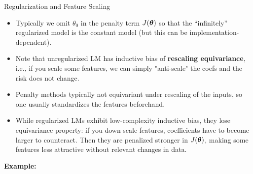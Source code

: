 \documentclass[11pt,compress,t,notes=noshow, xcolor=table]{beamer}
\begin{document}
\begin{vbframe}{Regularization and Feature Scaling}

  \begin{itemize}
    \item Typically we omit $\theta_0$ in the penalty term $J(\bm{\theta})$ so that the ``infinitely'' regularized model is the constant model (but this can be implementation-dependent).
    \item Note that unregularized LM has inductive bias of \textbf{rescaling equivariance}, i.e., if you scale some features, we can simply "anti-scale" the coefs and the risk does not change.
    \item Penalty methods typically not equivariant under rescaling of the inputs, so one usually standardizes the features beforehand.  
    \item While regularized LMs exhibit low-complexity inductive bias, they lose equivariance property: if you down-scale features, coefficients have to become larger to counteract. Then they are penalized stronger in $J(\bm{\theta})$, making some features less attractive without relevant changes in data.
      
  \end{itemize}

\framebreak

\textbf{Example:}\\


\end{vbframe}
\end{document}
